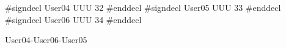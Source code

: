 \documentclass{article}
\begin{document}
#signdecl User04 UUU 32 #enddecl
#signdecl User05 UUU 33 #enddecl  
#signdecl User06 UUU 34 #enddecl  

\begin{hieroglyph}
\end{hieroglyph}
\begin{hieroglyph}
User04-User06-User05
\end{hieroglyph}
\end{document}
